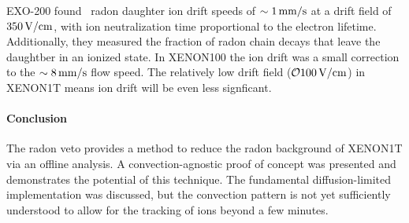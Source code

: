 EXO-200 found~\cite{Albert:2015vma} radon daughter ion drift speeds of $\sim 1\,\mathrm{mm/s}$ at a drift field of $350\,\mathrm{V/cm}$, with ion neutralization time proportional to the electron lifetime. Additionally, they measured the fraction of radon chain decays that leave the daughtber in an ionized state. In XENON100 the ion drift was a small correction to the $\sim 8\,\mathrm{mm/s}$ flow speed. The relatively low drift field ($\mathcal{O}{100}\,\mathrm{V/cm}$) in XENON1T means ion drift will be even less signficant.

\paragraph{Conclusion}

The radon veto provides a method to reduce the radon background of XENON1T via an offline analysis. A convection-agnostic proof of concept was presented and demonstrates the potential of this technique. The fundamental diffusion-limited implementation was discussed, but the convection pattern is not yet sufficiently understood to allow for the tracking of ions beyond a few minutes.